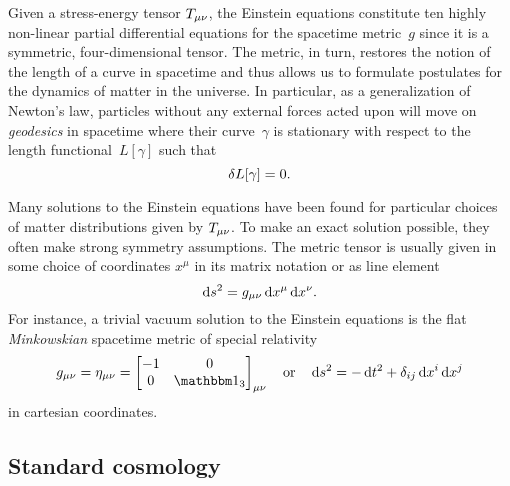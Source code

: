 \documentclass[12pt,parskip=half]{scrreprt}
\begin{document}
Given a stress-energy tensor \(T_{\mu \nu}\), the Einstein equations constitute ten highly non-linear partial differential equations for the spacetime metric~\(g\) since it is a symmetric, four-dimensional tensor. The metric, in turn, restores the notion of the length of a curve in spacetime and thus allows us to formulate postulates for the dynamics of matter in the universe. In particular, as a generalization of Newton's law, particles without any external forces acted upon will move on \emph{geodesics} in spacetime where their curve~\(\gamma\) is stationary with respect to the length functional~\(L[\gamma]\) such that
\begin{equation}
	\delta L[\gamma] = 0
	\mathpunct{.}
\end{equation}

Many solutions to the Einstein equations have been found for particular choices of matter distributions given by \(T_{\mu\nu}\). To make an exact solution possible, they often make strong symmetry assumptions. The metric tensor is usually given in some choice of coordinates \(x^\mu\) in its matrix notation or as line element
\begin{equation}
	\dif{s}^2 = g_{\mu \nu}\dif{x}^\mu \dif{x}^\nu
	\eqpunct{.}
\end{equation}
For instance, a trivial vacuum solution to the Einstein equations is the flat \emph{Minkowskian} spacetime metric of special relativity
\begin{equation}
	g_{\mu \nu} = \eta_{\mu \nu} =
	\begin{bmatrix}
		-1 & 0 \\
		0 & \idmat_3
	\end{bmatrix}_{\mu \nu} \quad \text{or} \quad \dif{s}^2 = -\dif{t}^2 + \delta_{ij} \dif{x}^i \dif{x}^j
\end{equation}
in cartesian coordinates.  


\subsection{Standard \FLRW cosmology}\label{sec:frw}
\end{document}
